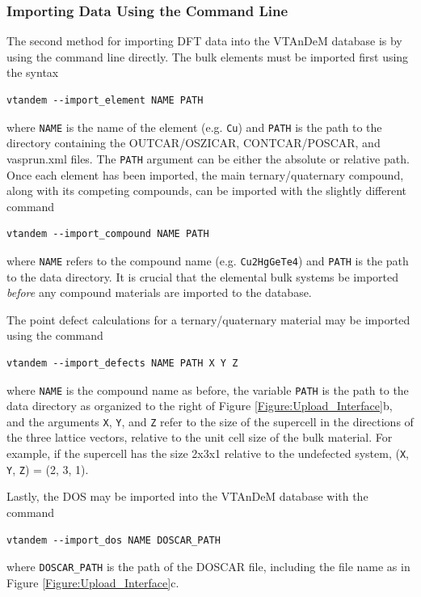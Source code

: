 \documentclass[%
 reprint,
 amsmath,amssymb,
 aps,
]{revtex4-1}
\begin{document}
\subsubsection{Importing Data Using the Command Line} \label{Subsubsection:Importing_Data_CL}

The second method for importing DFT data into the VTAnDeM database is by using the command line directly. The bulk elements must be imported first using the syntax
\begin{verbatim}
vtandem --import_element NAME PATH
\end{verbatim}
where \verb+NAME+ is the name of the element (e.g. \verb+Cu+) and \verb+PATH+ is the path to the directory containing the OUTCAR/OSZICAR, CONTCAR/POSCAR, and vasprun.xml files. The \verb+PATH+ argument can be either the absolute or relative path. Once each element has been imported, the main ternary/quaternary compound, along with its competing compounds, can be imported with the slightly different command
\begin{verbatim}
vtandem --import_compound NAME PATH
\end{verbatim}
where \verb+NAME+ refers to the compound name (e.g. \verb+Cu2HgGeTe4+) and \verb+PATH+ is the path to the data directory. It is crucial that the elemental bulk systems be imported \textit{before} any compound materials are imported to the database.

The point defect calculations for a ternary/quaternary material may be imported using the command
\begin{verbatim}
vtandem --import_defects NAME PATH X Y Z
\end{verbatim}
where \verb+NAME+ is the compound name as before, the variable \verb+PATH+ is the path to the data directory as organized to the right of Figure \ref{Figure:Upload_Interface}b, and the arguments \verb+X+, \verb+Y+, and \verb+Z+ refer to the size of the supercell in the directions of the three lattice vectors, relative to the unit cell size of the bulk material. For example, if the supercell has the size 2x3x1 relative to the undefected system, (\verb+X+, \verb+Y+, \verb+Z+) = (2, 3, 1).

Lastly, the DOS may be imported into the VTAnDeM database with the command 
\begin{verbatim}
vtandem --import_dos NAME DOSCAR_PATH
\end{verbatim}
where \verb+DOSCAR_PATH+ is the path of the DOSCAR file, including the file name as in Figure \ref{Figure:Upload_Interface}c.
\end{document}
